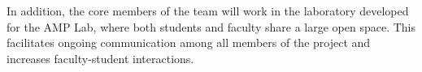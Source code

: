 In addition, the core members of the team will work in the laboratory developed for the AMP Lab, where both students and faculty share a large open space.  This facilitates ongoing communication among all members of the project and increases faculty-student interactions.


